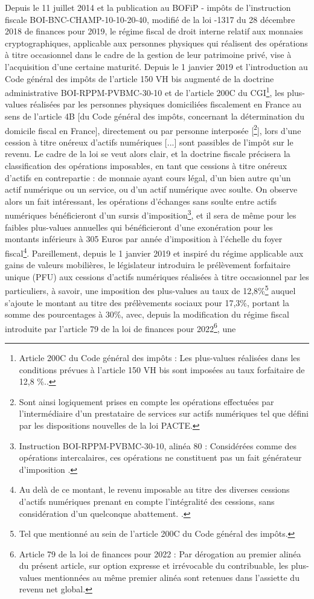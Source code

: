 {Depuis le 11 juillet 2014 et la publication au BOFiP - impôts de l'instruction fiscale BOI-BNC-CHAMP-10-10-20-40, modifié de la loi -1317 du 28 décembre 2018 de finances pour 2019, le régime fiscal de droit interne relatif aux monnaies cryptographiques, applicable aux personnes physiques qui réalisent des opérations à titre occasionnel dans le cadre de la gestion de leur patrimoine privé, vise à l'acquisition d'une certaine maturité. Depuis le 1 janvier 2019 et l'introduction au Code général des impôts de l'article 150 VH bis augmenté de la doctrine administrative BOI-RPPM-PVBMC-30-10 et de l'article 200C du CGI\footnote{Article 200C du Code général des impôts : \og Les plus-values réalisées dans les conditions prévues à l'article 150 VH bis sont imposées au taux forfaitaire de 12,8 \%.\fg{}.}, les plus-values réalisées par \og les personnes physiques domiciliées fiscalement en France au sens de l'article 4B [du Code général des impôts, concernant la détermination du domicile fiscal en France], directement ou par personne interposée [\footnote{Sont ainsi logiquement prises en compte les opérations effectuées par l'intermédiaire d'un prestataire de services sur actifs numériques tel que défini par les dispositions nouvelles de la loi PACTE.}], lors d'une cession à titre onéreux d'actifs numériques [...] sont passibles de l'impôt sur le revenu\fg{}. Le cadre de la loi se veut alors clair, et la doctrine fiscale précisera la classification des opérations imposables, en tant que cessions à titre onéreux d'actifs en contrepartie : de monnaie ayant cours légal, d'un bien autre qu'un actif numérique ou un service, ou d'un actif numérique avec soulte. On observe alors un fait intéressant, les opérations d'échanges sans soulte entre actifs numériques bénéficieront d'un sursis d'imposition\footnote{Instruction BOI-RPPM-PVBMC-30-10, alinéa 80 : \og Considérées comme des opérations intercalaires, ces opérations ne constituent pas un fait générateur d'imposition \fg{}.}, et il sera de même pour les faibles plus-values annuelles qui bénéficieront d'une exonération pour les montants inférieurs à 305 Euros par année d'imposition à l'échelle du foyer fiscal\footnote{Au delà de ce montant, le revenu imposable au titre des diverses cessions d'actifs numériques prenant en compte l'intégralité des cessions, sans considération d'un quelconque abattement. .}. Pareillement, depuis le 1 janvier 2019 et inspiré du régime applicable aux gains de valeurs mobilières, le législateur introduira le prélèvement forfaitaire unique (\acrshort{PFU}) aux cessions d'actifs numériques réalisées à titre occasionnel par les particuliers, à savoir, une imposition des plus-values au taux de 12,8\%\footnote{Tel que mentionné au sein de l'article 200C du Code général des impôts.} auquel s'ajoute le montant au titre des prélèvements sociaux pour 17,3\%, portant la somme des pourcentages à 30\%, avec, depuis la modification du régime fiscal introduite par l'article 79 de la loi de finances pour 2022\footnote{Article 79 de la loi de finances pour 2022 : \og Par dérogation au premier alinéa du présent article, sur option expresse et irrévocable du contribuable, les plus-values mentionnées au même premier alinéa sont retenues dans l'assiette du revenu net global\fg{}.}, une }
